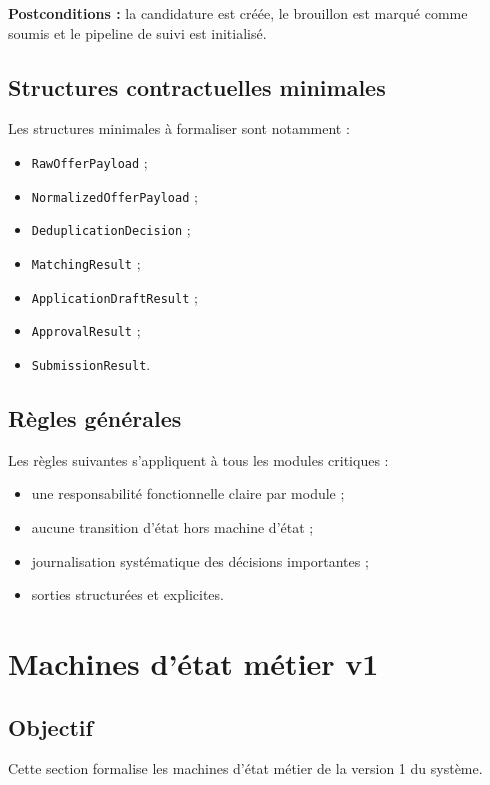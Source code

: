 \documentclass[11pt,a4paper]{article}
\begin{document}
\textbf{Postconditions :}
la candidature est créée, le brouillon est marqué comme soumis et le pipeline de suivi est initialisé.

\subsection{Structures contractuelles minimales}

Les structures minimales à formaliser sont notamment :

\begin{itemize}
    \item \texttt{RawOfferPayload} ;
    \item \texttt{NormalizedOfferPayload} ;
    \item \texttt{DeduplicationDecision} ;
    \item \texttt{MatchingResult} ;
    \item \texttt{ApplicationDraftResult} ;
    \item \texttt{ApprovalResult} ;
    \item \texttt{SubmissionResult}.
\end{itemize}

\subsection{Règles générales}

Les règles suivantes s’appliquent à tous les modules critiques :

\begin{itemize}
    \item une responsabilité fonctionnelle claire par module ;
    \item aucune transition d’état hors machine d’état ;
    \item journalisation systématique des décisions importantes ;
    \item sorties structurées et explicites.
\end{itemize}

\section{Machines d’état métier v1}

\subsection{Objectif}

Cette section formalise les machines d’état métier de la version 1 du système.
\end{document}
